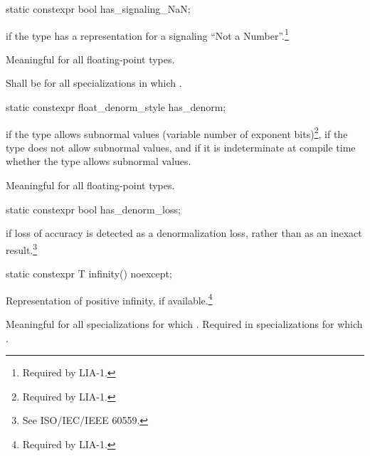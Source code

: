 %
\begin{itemdecl}
static constexpr bool has_signaling_NaN;
\end{itemdecl}

\begin{itemdescr}
\pnum
{} if the type has a representation for a signaling ``Not a Number''.\footnote{Required by LIA-1.}

\pnum
Meaningful for all floating-point types.

\pnum
Shall be
for all specializations in which
.
\end{itemdescr}

%
\begin{itemdecl}
static constexpr float_denorm_style has_denorm;
\end{itemdecl}

%
\begin{itemdescr}
\pnum
{}
if the type allows subnormal values
(variable number of exponent bits)\footnote{Required by LIA-1.},
if the type does not allow subnormal values,
and
if it is indeterminate at compile time whether the type allows
subnormal values.

\pnum
Meaningful for all floating-point types.
\end{itemdescr}

%
\begin{itemdecl}
static constexpr bool has_denorm_loss;
\end{itemdecl}

\begin{itemdescr}
\pnum
{} if loss of accuracy is detected as a
denormalization loss, rather than as an inexact result.\footnote{See
ISO/IEC/IEEE 60559.}
\end{itemdescr}

%
\begin{itemdecl}
static constexpr T infinity() noexcept;
\end{itemdecl}

\begin{itemdescr}
\pnum
Representation of positive infinity, if available.\footnote{Required by LIA-1.}

\pnum
Meaningful for all specializations for which
.
Required in specializations for which
.
\end{itemdescr}

